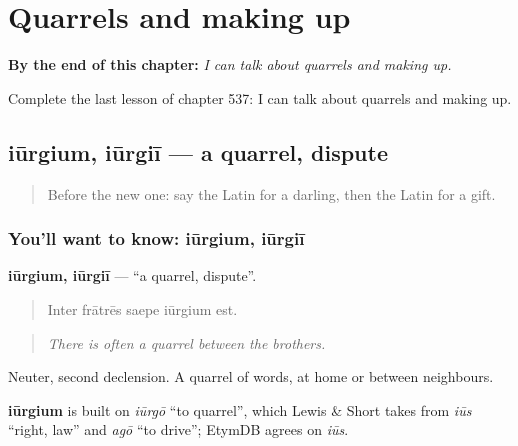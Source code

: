 
\chapter{Quarrels and making up}
\label{ch:la-quarrels-and-making-up}

\begin{chapteropening}
\textbf{By the end of this chapter:} \emph{I can talk about quarrels and making up.}

Complete the last lesson of chapter 537: I can talk about quarrels and making up.
\end{chapteropening}

\section[iūrgium, iūrgiī]{iūrgium, iūrgiī — a quarrel, dispute}

\label{lesson:LA-C537-iurgium}



\begin{quote}
Before the new one: say the Latin for a darling, then the Latin for a gift.
\end{quote}

\subsection*{You'll want to know: iūrgium, iūrgiī}
\textbf{iūrgium, iūrgiī} — \textquotedblleft{}a quarrel, dispute\textquotedblright{}.

\begin{quote}
Inter frātrēs saepe iūrgium est.
\end{quote}

\begin{quote}
\emph{There is often a quarrel between the brothers.}
\end{quote}

Neuter, second declension. A quarrel of words, at home or between neighbours.

\begin{cousinweb}
\textbf{iūrgium} is built on \emph{iūrgō} \textquotedblleft{}to quarrel\textquotedblright{}, which Lewis \& Short takes from \emph{iūs} \textquotedblleft{}right, law\textquotedblright{} and \emph{agō} \textquotedblleft{}to drive\textquotedblright{}; EtymDB agrees on \emph{iūs}.
\end{cousinweb}

